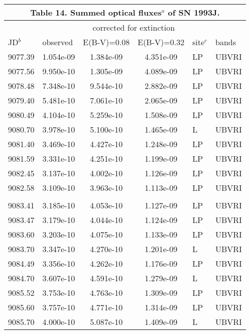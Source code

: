 \begin{center}
\begin{tabular} {l l c c l l}
\multicolumn{6}{c}{Table 14. Summed optical fluxes$^a$ of SN 1993J.} \\ \hline \hline
 & & \multicolumn{2}{c}{corrected for extinction} & & \\
JD$^b$ & \hfil observed \hfil  & \hfil E(B-V)=0.08 \hfil   & \hfil E(B-V)=0.32 \hfil  & \hfil  site$^c$ \hfil  & \hfil  bands \hfil \\ \hline
   9077.39  &  1.054e-09  &  1.384e-09  &  4.351e-09 &  LP & UBVRI  \\
   9077.56  &  9.950e-10  &  1.305e-09  &  4.089e-09 &  LP & UBVRI  \\
   9078.48  &  7.348e-10  &  9.544e-10  &  2.882e-09 &  LP & UBVRI  \\
   9079.40  &  5.481e-10  &  7.061e-10  &  2.065e-09 &  LP & UBVRI  \\
   9080.49  &  4.104e-10  &  5.259e-10  &  1.508e-09 &  LP & UBVRI  \\
   9080.70  &  3.978e-10  &  5.100e-10  &  1.465e-09 &  L& UBVRI  \\
   9081.40  &  3.469e-10  &  4.427e-10  &  1.248e-09 &  LP & UBVRI  \\
   9081.59  &  3.331e-10  &  4.251e-10  &  1.199e-09 &  LP & UBVRI  \\
   9082.45  &  3.137e-10  &  4.002e-10  &  1.126e-09 &  LP & UBVRI  \\
   9082.58  &  3.109e-10  &  3.963e-10  &  1.113e-09 &  LP & UBVRI  \\
 \\ 
   9083.41  &  3.185e-10  &  4.053e-10  &  1.127e-09 &  LP & UBVRI  \\
   9083.47  &  3.179e-10  &  4.044e-10  &  1.124e-09 &  LP & UBVRI  \\
   9083.60  &  3.203e-10  &  4.075e-10  &  1.133e-09 &  LP & UBVRI  \\
   9083.70  &  3.347e-10  &  4.270e-10  &  1.201e-09 &  L& UBVRI  \\
   9084.49  &  3.356e-10  &  4.262e-10  &  1.176e-09 &  LP & UBVRI  \\
   9084.70  &  3.607e-10  &  4.591e-10  &  1.279e-09 &  L& UBVRI  \\
   9085.52  &  3.753e-10  &  4.763e-10  &  1.309e-09 &  LP & UBVRI  \\
   9085.60  &  3.757e-10  &  4.771e-10  &  1.314e-09 &  LP & UBVRI  \\
   9085.70  &  4.000e-10  &  5.087e-10  &  1.409e-09 &  L& UBVRI  \\

\end{tabular}
\end{center}

